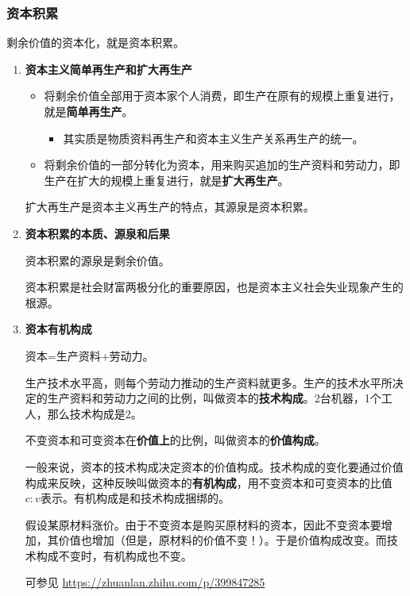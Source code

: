 \documentclass[12pt, a4paper, oneside]{ctexart}
\begin{document}
\subsubsection{资本积累}

剩余价值的资本化，就是资本积累。

\begin{enumerate}
  \item {\bf 资本主义简单再生产和扩大再生产}
  
  \begin{itemize}
    \item 将剩余价值全部用于资本家个人消费，即生产在原有的规模上重复进行，就是\textbf{简单再生产}。
    \begin{itemize}
      \item 其实质是物质资料再生产和资本主义生产关系再生产的统一。
    \end{itemize}
    \item 将剩余价值的一部分转化为资本，用来购买追加的生产资料和劳动力，即生产在扩大的规模上重复进行，就是\textbf{扩大再生产}。
  \end{itemize}

  扩大再生产是资本主义再生产的特点，其源泉是资本积累。

  \item {\bf 资本积累的本质、源泉和后果}
  
  资本积累的源泉是剩余价值。

  资本积累是社会财富两极分化的重要原因，也是资本主义社会失业现象产生的根源。

  \item {\bf 资本有机构成}
  
  资本=生产资料+劳动力。

  生产技术水平高，则每个劳动力推动的生产资料就更多。生产的技术水平所决定的生产资料和劳动力之间的比例，叫做资本的\textbf{技术构成}。2台机器，1个工人，那么技术构成是2。

  不变资本和可变资本在\textbf{价值上}的比例，叫做资本的\textbf{价值构成}。

  一般来说，资本的技术构成决定资本的价值构成。技术构成的变化要通过价值构成来反映，这种反映叫做资本的\textbf{有机构成}，用不变资本和可变资本的比值$c:v$表示。有机构成是和技术构成捆绑的。

  假设某原材料涨价。由于不变资本是购买原材料的资本，因此不变资本要增加，其价值也增加（但是，原材料的价值不变！）。于是价值构成改变。而技术构成不变时，有机构成也不变。

  可参见 \href{https://zhuanlan.zhihu.com/p/399847285}{https://zhuanlan.zhihu.com/p/399847285}


\end{enumerate}
\end{document}
